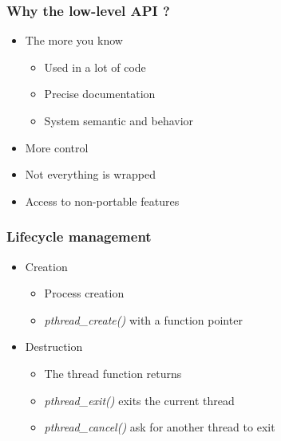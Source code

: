 \begin{frame}
  \frametitle{Why the low-level API ?}

  \begin{itemize}
  \item The more you know
    \begin{itemize}
    \item Used in a lot of code
    \item Precise documentation
    \item System semantic and behavior
    \end{itemize}
  \item More control
  \item Not everything is wrapped
  \item Access to non-portable features
  \end{itemize}
\end{frame}


\begin{frame}
  \frametitle{Lifecycle management}

  \begin{itemize}
  \item Creation
    \begin{itemize}
    \item Process creation
    \item \emph{pthread\_create()} with a function pointer
    \end{itemize}
  \item Destruction
    \begin{itemize}
    \item The thread function returns
    \item \emph{pthread\_exit()} exits the current thread
    \item \emph{pthread\_cancel()} ask for another thread to exit
    \end{itemize}
  \end{itemize}
\end{frame}



